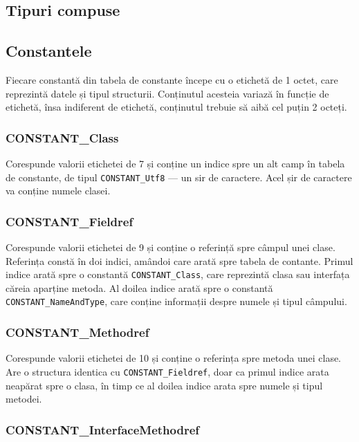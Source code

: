 \subsection{Tipuri compuse}

\subsection{Constantele}

Fiecare constantă din tabela de constante începe cu o etichetă de 1
octet, care reprezintă datele și tipul structurii. Conținutul acesteia
variază în funcție de etichetă, însa indiferent de etichetă, conținutul
trebuie să aibă cel puțin 2 octeți.

\subsubsection{CONSTANT\_Class}

Corespunde valorii etichetei de 7 și conține un indice spre un alt camp
în tabela de constante, de tipul \texttt{CONSTANT\_Utf8} --- un sir de
caractere. Acel șir de caractere va conține numele clasei.

\subsubsection{CONSTANT\_Fieldref}

Corespunde valorii etichetei de 9 și conține o referință spre câmpul
unei clase. Referința constă în doi indici, amândoi care arată spre
tabela de contante. Primul indice arată spre o constantă
\texttt{CONSTANT\_Class}, care reprezintă clasa sau interfața căreia
aparține metoda. Al doilea indice arată spre o constantă
\texttt{CONSTANT\_NameAndType}, care conține informații despre numele și
tipul câmpului.

\subsubsection{CONSTANT\_Methodref}

Corespunde valorii etichetei de 10 și conține o referința spre metoda
unei clase. Are o structura identica cu \texttt{CONSTANT\_Fieldref},
doar ca primul indice arata neapărat spre o clasa, în timp ce al doilea
indice arata spre numele și tipul metodei.

\subsubsection{CONSTANT\_InterfaceMethodref}

